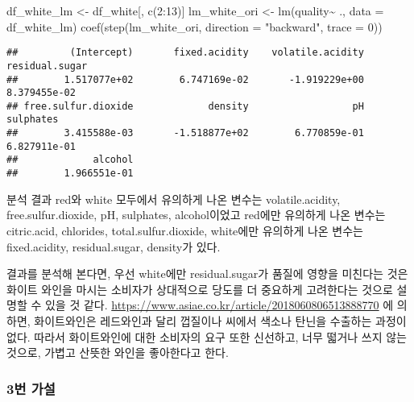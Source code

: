 \documentclass[
]{article}
\newenvironment{Shaded}{\begin{snugshade}}{\end{snugshade}}
\newcommand{\AttributeTok}[1]{\textcolor[rgb]{0.77,0.63,0.00}{#1}}
\newcommand{\DecValTok}[1]{\textcolor[rgb]{0.00,0.00,0.81}{#1}}
\newcommand{\FunctionTok}[1]{\textcolor[rgb]{0.00,0.00,0.00}{#1}}
\newcommand{\NormalTok}[1]{#1}
\newcommand{\OtherTok}[1]{\textcolor[rgb]{0.56,0.35,0.01}{#1}}
\newcommand{\SpecialCharTok}[1]{\textcolor[rgb]{0.00,0.00,0.00}{#1}}
\newcommand{\StringTok}[1]{\textcolor[rgb]{0.31,0.60,0.02}{#1}}
\begin{document}
\begin{Shaded}
\begin{Highlighting}[]
\NormalTok{df\_white\_lm }\OtherTok{\textless{}{-}}\NormalTok{ df\_white[, }\FunctionTok{c}\NormalTok{(}\DecValTok{2}\SpecialCharTok{:}\DecValTok{13}\NormalTok{)]}
\NormalTok{lm\_white\_ori }\OtherTok{\textless{}{-}} \FunctionTok{lm}\NormalTok{(quality}\SpecialCharTok{\textasciitilde{}}\NormalTok{ ., }\AttributeTok{data =}\NormalTok{ df\_white\_lm)}
\FunctionTok{coef}\NormalTok{(}\FunctionTok{step}\NormalTok{(lm\_white\_ori, }\AttributeTok{direction =} \StringTok{"backward"}\NormalTok{, }\AttributeTok{trace =} \DecValTok{0}\NormalTok{))}
\end{Highlighting}
\end{Shaded}

\begin{verbatim}
##         (Intercept)       fixed.acidity    volatile.acidity      residual.sugar 
##        1.517077e+02        6.747169e-02       -1.919229e+00        8.379455e-02 
## free.sulfur.dioxide             density                  pH           sulphates 
##        3.415588e-03       -1.518877e+02        6.770859e-01        6.827911e-01 
##             alcohol 
##        1.966551e-01
\end{verbatim}

분석 결과 red와 white 모두에서 유의하게 나온 변수는 volatile.acidity,
free.sulfur.dioxide, pH, sulphates, alcohol이었고 red에만 유의하게 나온
변수는 citric.acid, chlorides, total.sulfur.dioxide, white에만 유의하게
나온 변수는 fixed.acidity, residual.sugar, density가 있다.

결과를 분석해 본다면, 우선 white에만 residual.sugar가 품질에 영향을
미친다는 것은 화이트 와인을 마시는 소비자가 상대적으로 당도를 더
중요하게 고려한다는 것으로 설명할 수 있을 것 같다.
\url{https://www.asiae.co.kr/article/2018060806513888770} 에 의하면,
화이트와인은 레드와인과 달리 껍질이나 씨에서 색소나 탄닌을 수출하는
과정이 없다. 따라서 화이트와인에 대한 소비자의 요구 또한 신선하고, 너무
떫거나 쓰지 않는 것으로, 가볍고 산뜻한 와인을 좋아한다고 한다.

\hypertarget{uxbc88-uxac00uxc124-2}{%
\subsubsection{3번 가설}\label{uxbc88-uxac00uxc124-2}}
\end{document}
